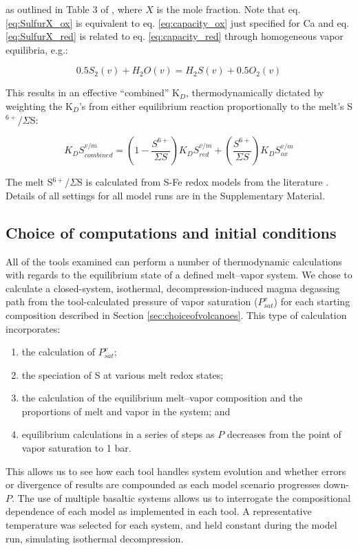 \documentclass[draft, english]{volcanica-template}
\begin{document}
\noindent as outlined in Table 3 of \textcite{Ding2023}, where $X$ is the mole fraction. Note that eq. \ref{eq:SulfurX_ox} is equivalent to eq. \ref{eq:capacity_ox} just specified for Ca and eq. \ref{eq:SulfurX_red} is related to eq. \ref{eq:capacity_red} through homogeneous vapor equilibria, e.g.:

\begin{equation}
    0.5S_2(v) + H_2O(v) = H_2S(v) + 0.5O_2(v)
\end{equation}

\noindent This results in an effective ``combined'' K$_D$, thermodynamically dictated by weighting the K$_D$'s from either equilibrium reaction proportionally to the melt's S$^{6+}$/$\Sigma$S:

\begin{equation}
    K_DS^{v/m}_{combined} = \left( 1-\frac{S^{6+}}{\Sigma{S}} \right) K_DS^{v/m}_{red} + \left(\frac{S^{6+}}{\Sigma{S}} \right) K_DS^{v/m}_{ox}
\end{equation}

\noindent The melt S$^{6+}$/$\Sigma$S is calculated from S-Fe redox models from the literature \parencite[e.g.,][]{Nash2019, Oneill2022, Muth2021}. Details of all settings for all model runs are in the Supplementary Material.

\subsection{Choice of computations and initial conditions}
\label{sec:choiceofcomputations}

All of the tools examined can perform a number of thermodynamic calculations with regards to the equilibrium state of a defined melt–vapor system. We chose to calculate a closed-system, isothermal, decompression-induced magma degassing path from the tool-calculated pressure of vapor saturation ($P^v_{sat}$) for each starting composition described in Section \ref{sec:choiceofvolcanoes}. This type of calculation incorporates:
\begin{enumerate}
\item the calculation of $P^v_{sat}$; 
\item the speciation of S at various melt redox states; 
\item the calculation of the equilibrium melt–vapor composition and the proportions of melt and vapor in the system; and 
\item equilibrium calculations in a series of steps as $P$ decreases from the point of vapor saturation to 1 bar. 
\end{enumerate}
This allows us to see how each tool handles system evolution and whether errors or divergence of results are compounded as each model scenario progresses down-$P$. The use of multiple basaltic systems allows us to interrogate the compositional dependence of each model as implemented in each tool. A representative temperature was selected for each system, and held constant during the model run, simulating isothermal decompression. 
\end{document}
